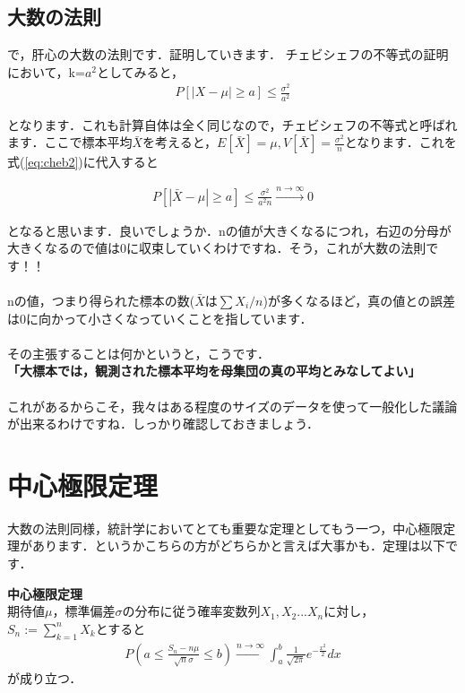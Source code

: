 \documentclass[11pt,a4paper]{ujreport} 	%
\begin{document}
\subsection{大数の法則}
で，肝心の大数の法則です．証明していきます．
チェビシェフの不等式の証明において，k=$a^2$としてみると，
\begin{align}
  P[|X-\mu| \geq a] \leq \frac{\sigma^2}{a^2}
  \label{eq:cheb2}
\end{align}

となります．これも計算自体は全く同じなので，チェビシェフの不等式と呼ばれます．ここで標本平均$\bar{X}$を考えると，$E[\bar{X}] = \mu, V[\bar{X}] = \frac{\sigma^2}{n}$となります．これを式(\ref{eq:cheb2})に代入すると

\begin{align}
  P[|\bar{X}-\mu|\geq a] \leq \frac{\sigma^2}{a^2n}　\xrightarrow{n\rightarrow\infty}0
\end{align}

となると思います．良いでしょうか．nの値が大きくなるにつれ，右辺の分母が大きくなるので値は0に収束していくわけですね．そう，これが大数の法則です！！\\
\\

nの値，つまり得られた標本の数($\bar{X}は\sum X_i/n$)が多くなるほど，真の値との誤差は0に向かって小さくなっていくことを指しています．\\\\

その主張することは何かというと，こうです．\\

\textbf{「大標本では，観測された標本平均を母集団の真の平均とみなしてよい」}\\
\\

これがあるからこそ，我々はある程度のサイズのデータを使って一般化した議論が出来るわけですね．しっかり確認しておきましょう．


\section{中心極限定理}
大数の法則同様，統計学においてとても重要な定理としてもう一つ，中心極限定理があります．というかこちらの方がどちらかと言えば大事かも．定理は以下です．\\

\begin{screen}
  \textbf{中心極限定理}\\
  期待値$\mu$，標準偏差$\sigma$の分布に従う確率変数列$X_1,X_2...X_n$に対し，$S_n := \sum_{k=1}^n X_k$とすると
  \begin{align}
    P(a \leq \frac{S_n -n\mu}{\sqrt{n}\sigma} \leq b) \xrightarrow{n\rightarrow\infty} \int_a^b \frac{1}{\sqrt{2\pi}}e^{-\frac{x^2}{2}}dx
  \end{align}
  が成り立つ．
\end{screen}
\end{document}
